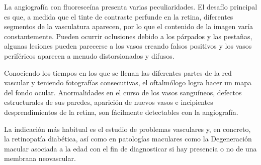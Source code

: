 La angiografía con fluoresceína presenta varias peculiaridades. El desafío principal es que, a medida que el tinte de contraste  perfunde en la retina, diferentes segmentos de la vasculatura aparecen, por lo que el contenido de la imagen varía constantemente.
Pueden ocurrir oclusiones debido a los párpados y las pestañas, algunas lesiones pueden parecerse a los vasos creando falsos positivos y los vasos periféricos aparecen a menudo distorsionados y difusos. \cite{perez2011improving}

Conociendo los tiempos en los que se llenan las diferentes partes de la red vascular y teniendo fotografías consecutivas, el oftalmólogo logra hacer un mapa del fondo ocular. Anormalidades en el curso de los vasos sanguíneos, defectos estructurales de sus paredes, aparición de nuevos vasos e incipientes desprendimientos de la retina, son fácilmente detectables con la angiografía. 

La indicación más habitual es el estudio de problemas vasculares y, en concreto, la retinopatía diabética, así como en patologías maculares como la Degeneración macular asociada a la edad con el fin de diagnosticar si hay presencia o no de una membrana neovascular.
\\

